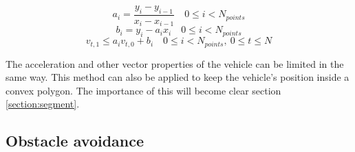 \begin{equation}
\label{eq:lin-a}
a_i = \dfrac{y_{i} - y_{i-1}}{x_{i} - x_{i-1}} \quad 0 \leq i < N_{points}
\end{equation}
\begin{equation}
\label{eq:lin-b}
b_i = y_{i} - a_i x_i  \quad 0 \leq i < N_{points}
\end{equation}
\begin{equation}
\label{eq:vmax}
v_{t, 1} \leq a_i v_{t,0} + b_i  \quad 0 \leq i < N_{points}, ~ 0 \leq t \leq N
\end{equation}


The acceleration and other vector properties of the vehicle can be limited in the same way. This method can also be applied to keep the vehicle's position inside a convex polygon. The importance of this will become clear section \ref{section:segment}.
\subsection{Obstacle avoidance}

